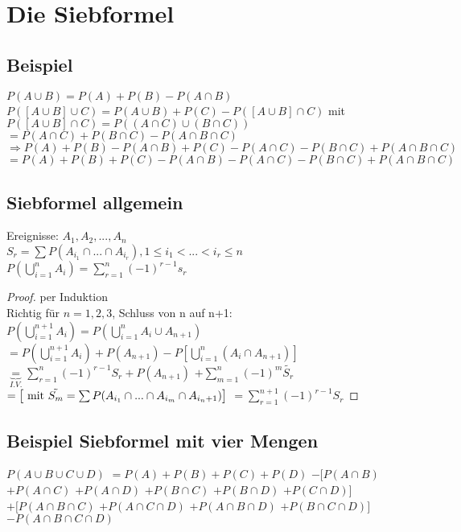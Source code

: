 \renewcommand{\ldate}{2015-10-27}

\section{Die Siebformel}

\subsection{Beispiel}
$P(A\cup B) = P(A) + P(B) - P(A\cap B)$\\
$P([A\cup B]\cup C) = P(A\cup B) + P(C) - P([A\cup B]\cap C)$ mit 
$P([A\cup B]\cap C) = P((A\cap C) \cup (B\cap C))$
$=P(A\cap C) + P(B\cap C) - P(A\cap B\cap C)$\\
$\Rightarrow P(A) + P(B) - P(A\cap B) + P(C) - P(A\cap C) - P(B\cap C) + P(A\cap B\cap C)$
$=P(A) + P(B) + P(C) - P(A\cap B) - P(A\cap C) - P(B\cap C) + P(A\cap B\cap C)$

\subsection{Siebformel allgemein}
Ereignisse: $A_1, A_2, ..., A_n$\\
$ S_r = \sum P(A_{i_1} \cap ... \cap A_{i_r}), 1\leq	 i_1 < ... < i_r \leq n $
$P(\bigcup_{i=1}^{n} A_i) = \sum_{r=1}^{n} (-1)^{r-1} s_r$

\begin{proof} per Induktion\\
Richtig für $n=1,2,3$, Schluss von n auf n+1:\\
$ P(\bigcup_{i=1}^{n+1} A_i) = P(\bigcup_{i=1}^n A_i \cup A_{n+1})$
$=P(\bigcup_{i=1}^{n+1} A_i) + P(A_{n+1}) - P[\bigcup_{i=1}^{n} (A_i \cap A_{n+1})]$
$\underbrace{=}_{I.V.} \sum_{r=1}^{n} (-1)^{r-1} S_r + P(A_{n+1})$
$ + \sum_{m=1}^{n} (-1)^m \tilde{S_r}$
$=  \left[ \textrm{ mit } \tilde{S_m} = \sum P(A_{i_1} \cap ... \cap A_{i_m} \cap A_{i_n+1}) \right] $
$= \sum_{r=1}^{n+1} (-1)^{r-1} S_r$
\end{proof}

\subsection{Beispiel Siebformel mit vier Mengen}
$ P(A \cup B \cup C \cup D)$
$= P(A)+P(B)+P(C)+P(D)$
$- [P(A\cap B)$
$ + P(A\cap C) $
$ + P(A\cap D) $
$+ P(B\cap C) $
$+ P(B\cap D) $
$+ P(C\cap D)]$
$+[P(A\cap B\cap C) $
$+ P(A\cap C\cap D) $
$+ P(A\cap B\cap D) $
$+ P(B\cap C\cap D)]$
$- P(A\cap B\cap C\cap D)$

